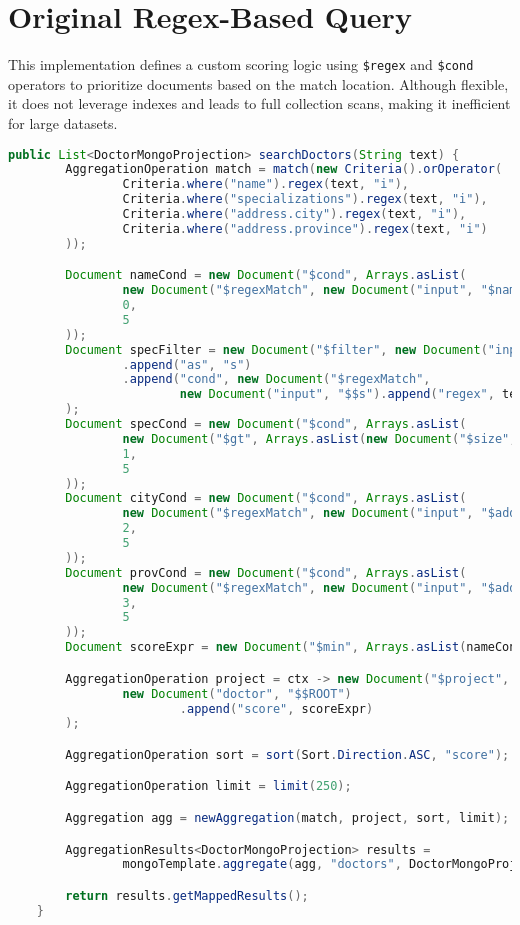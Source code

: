 \chapter{Original Regex-Based Query}
\label{ch:original-regex-query}
This implementation defines a custom scoring logic using \texttt{\$regex} and \texttt{\$cond} operators to prioritize documents based on the match location. Although flexible, it does not leverage indexes and leads to full collection scans, making it inefficient for large datasets. 

\begin{lstlisting}[language=java, caption={Java code for searching doctors with regex}]
public List<DoctorMongoProjection> searchDoctors(String text) {
        AggregationOperation match = match(new Criteria().orOperator(
                Criteria.where("name").regex(text, "i"),
                Criteria.where("specializations").regex(text, "i"),
                Criteria.where("address.city").regex(text, "i"),
                Criteria.where("address.province").regex(text, "i")
        ));

        Document nameCond = new Document("$cond", Arrays.asList(
                new Document("$regexMatch", new Document("input", "$name").append("regex", text).append("options", "i")),
                0,
                5
        ));
        Document specFilter = new Document("$filter", new Document("input", "$specializations")
                .append("as", "s")
                .append("cond", new Document("$regexMatch",
                        new Document("input", "$$s").append("regex", text).append("options", "i")))
        );
        Document specCond = new Document("$cond", Arrays.asList(
                new Document("$gt", Arrays.asList(new Document("$size", specFilter), 0)),
                1,
                5
        ));
        Document cityCond = new Document("$cond", Arrays.asList(
                new Document("$regexMatch", new Document("input", "$address.city").append("regex", text).append("options", "i")),
                2,
                5
        ));
        Document provCond = new Document("$cond", Arrays.asList(
                new Document("$regexMatch", new Document("input", "$address.province").append("regex", text).append("options", "i")),
                3,
                5
        ));
        Document scoreExpr = new Document("$min", Arrays.asList(nameCond, specCond, cityCond, provCond));

        AggregationOperation project = ctx -> new Document("$project",
                new Document("doctor", "$$ROOT")
                        .append("score", scoreExpr)
        );

        AggregationOperation sort = sort(Sort.Direction.ASC, "score");

        AggregationOperation limit = limit(250);

        Aggregation agg = newAggregation(match, project, sort, limit);

        AggregationResults<DoctorMongoProjection> results =
                mongoTemplate.aggregate(agg, "doctors", DoctorMongoProjection.class);

        return results.getMappedResults();
    }
\end{lstlisting}

